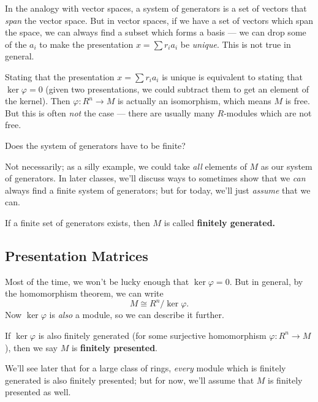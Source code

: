 In the analogy with vector spaces, a system of generators is a set of vectors that \emph{span} the vector space. But in vector spaces, if we have a set of vectors which span the space, we can always find a subset which forms a basis --- we can drop some of the $a_i$ to make the presentation $x = \sum r_ia_i$ be \emph{unique}. This is not true in general. 

Stating that the presentation $x = \sum r_ia_i$ is unique is equivalent to stating that $\ker \varphi = 0$ (given two presentations, we could subtract them to get an element of the kernel). Then $\varphi : R^n \to M$ is actually an isomorphism, which means $M$ is free. But this is often \emph{not} the case --- there are usually many $R$-modules which are not free. 

\begin{question}
Does the system of generators have to be finite?
\end{question}

\begin{ans}
Not necessarily; as a silly example, we could take \emph{all} elements of $M$ as our system of generators. In later classes, we'll discuss ways to sometimes show that we \emph{can} always find a finite system of generators; but for today, we'll just \emph{assume} that we can. 
\end{ans}

\begin{definition}
If a finite set of generators exists, then $M$ is called \textbf{finitely generated.} 
\end{definition}

\subsection{Presentation Matrices}

Most of the time, we won't be lucky enough that $\ker \varphi = 0$. But in general, by the homomorphism theorem, we can write \[M \cong R^n/\ker \varphi.\] Now $\ker \varphi$ is \emph{also} a module, so we can describe it further. 

\begin{definition}
If $\ker \varphi$ is also finitely generated (for some surjective homomorphism $\varphi : R^n \to M$), then we say $M$ is \textbf{finitely presented}. 
\end{definition}

We'll see later that for a large class of rings, \emph{every} module which is finitely generated is also finitely presented; but for now, we'll assume that $M$ is finitely presented as well. 

